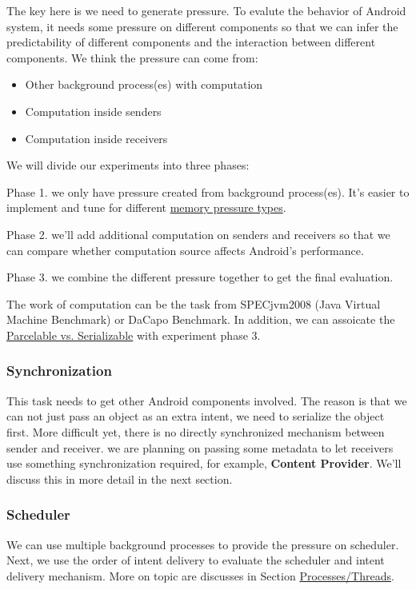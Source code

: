 \documentclass[11pt]{article}
\begin{document}
The key here is we need to generate pressure.
To evalute the behavior of Android system, it needs some pressure on
different components so that we can infer the predictability of different
components and the interaction between different components.
We think the pressure can come from:

\begin{itemize}
\item Other background process(es) with computation
\item Computation inside senders
\item Computation inside receivers
\end{itemize}

We will divide our experiments into three phases:

Phase 1. we only have pressure created from background process(es).
It's easier to implement and tune for different \hyperref[Memory-Pressure-Types]{memory pressure types}.

Phase 2. we'll add additional computation on senders and receivers so that we can compare
whether computation source affects Android's performance.

Phase 3. we combine the different pressure together to get the final evaluation.

The work of computation can be the task from SPECjvm2008 (Java Virtual Machine Benchmark) or DaCapo Benchmark.
In addition, we can assoicate the \hyperref[Parcelable/Serializable]{Parcelable vs. Serializable} with experiment phase 3.

\subsubsection{Synchronization}
\label{sec-3-2-2}
This task needs to get other Android components involved.
The reason is that we can not just pass an object as an extra intent, we need to serialize the object first.
More difficult yet, there is no directly synchronized mechanism between sender and receiver.
we are planning on passing some metadata to let receivers use something synchronization required, for example, \textbf{Content Provider}. We'll discuss this in more detail in the next section.

\subsubsection{Scheduler}
\label{sec-3-2-3}
We can use multiple background processes to provide the pressure on scheduler.
Next, we use the order of intent delivery to evaluate the scheduler and intent delivery mechanism. More on topic are discusses in Section \hyperref[Processes/Threads]{Processes/Threads}.
\end{document}
